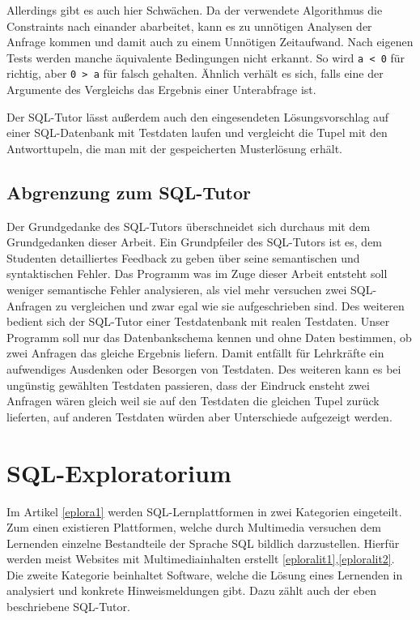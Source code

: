 Allerdings gibt es auch hier Schwächen. Da der verwendete Algorithmus die Constraints nach einander abarbeitet, kann es zu unnötigen Analysen der Anfrage kommen und damit auch zu einem Unnötigen Zeitaufwand. Nach eigenen Tests werden manche äquivalente Bedingungen nicht erkannt. So wird \verb|a < 0| für richtig, aber \verb|0 > a| für falsch gehalten. Ähnlich verhält es sich, falls eine der Argumente des Vergleichs das Ergebnis einer Unterabfrage ist.

Der SQL-Tutor lässt außerdem auch den eingesendeten Lösungsvorschlag auf einer SQL-Datenbank mit Testdaten laufen und vergleicht die Tupel mit den Antworttupeln, die man mit der gespeicherten Musterlösung erhält.

\subsection*{Abgrenzung zum SQL-Tutor}

Der Grundgedanke des SQL-Tutors überschneidet sich durchaus mit dem Grundgedanken dieser Arbeit. Ein Grundpfeiler des SQL-Tutors ist es, dem Studenten detailliertes Feedback zu geben über seine semantischen und syntaktischen Fehler. Das Programm was im Zuge dieser Arbeit entsteht soll weniger semantische Fehler analysieren, als viel mehr versuchen zwei SQL-Anfragen zu vergleichen und zwar egal wie sie aufgeschrieben sind. Des weiteren bedient sich der SQL-Tutor einer Testdatenbank mit realen Testdaten. Unser Programm soll nur das Datenbankschema kennen und ohne Daten bestimmen, ob zwei Anfragen das gleiche Ergebnis liefern. Damit entfällt für Lehrkräfte ein aufwendiges Ausdenken oder Besorgen von Testdaten. Des weiteren kann es bei ungünstig gewählten Testdaten passieren, dass der Eindruck ensteht zwei Anfragen wären gleich weil sie auf den Testdaten die gleichen Tupel zurück lieferten, auf anderen Testdaten würden aber Unterschiede aufgezeigt werden. 

\section{SQL-Exploratorium}

Im Artikel \ref{eplora1} werden SQL-Lernplattformen in zwei Kategorien eingeteilt. Zum einen existieren Plattformen, welche durch Multimedia versuchen dem Lernenden einzelne Bestandteile der Sprache SQL bildlich darzustellen. Hierfür werden meist Websites mit Multimediainhalten erstellt \ref{eploralit1},\ref{eploralit2}. Die zweite Kategorie beinhaltet Software, welche die Lösung eines Lernenden in analysiert und konkrete Hinweismeldungen gibt. Dazu zählt auch der eben beschriebene SQL-Tutor.

